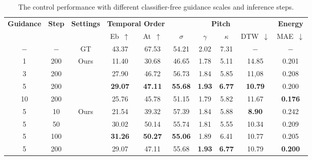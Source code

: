 \documentclass[letterpaper]{article} %
\begin{document}
\begin{table}[!t]
    \centering
    \caption{The control performance with different classifier-free guidance scales and inference steps.}
    \label{tab:classifier-Free guidance and inference steps}
        \begin{tabular}{cc|c|cc|cccc|c}
        \toprule
        \multirow{2}{*}{\textbf{Guidance}} & \multirow{2}{*}{\textbf{Step}} & \multirow{2}{*}{\textbf{Settings}} & \multicolumn{2}{c}{\textbf{Temporal Order}} & \multicolumn{4}{|c}{\textbf{Pitch}} & \multicolumn{1}{|c}{\textbf{Energy}} \\
        & &  & Eb~$\uparrow$ & At~$\uparrow$ & $\sigma$ & $\gamma$ & $\kappa$ & DTW~$\downarrow$ & MAE~$\downarrow$ \\
        \midrule
        \midrule
         $-$ & $-$ & GT & 43.37 & 67.53 & 54.21 & 2.02 & 7.31 & $-$ & $-$ \\
         \midrule
         1 & 200 & \multirow{4}{*}{Ours} & 11.40 & 30.68 & 46.65 & 1.78 & 5.11 & 14.85 & 0.201 \\
         3 & 200 & & 27.90 & 46.72 & 56.73 & 1.84 & 5.85 & 11,08 & 0.208 \\
         5 & 200 & &  \textbf{29.07} & \textbf{47.11} & \textbf{55.68} & \textbf{1.93} & \textbf{6.77} & \textbf{10.79} & 0.200 \\
         10 & 200 & &  25.76 & 45.78 & 51.15 & 1.79 & 5.82 & 11.67 & \textbf{0.176} \\
         \midrule
         5 & 10 & \multirow{4}{*}{Ours} &  21.54 & 39.32 & 57.39 & 1.84 & 5.88 & \textbf{8.90} & 0.242 \\
         5 & 50 & &  30.02 & 50.14 & 55.74 & 1.81 & 5.55 & 10.34 & 0.209 \\
         5 & 100 & & \textbf{31.26} & \textbf{50.27} & \textbf{55.06} & 1.89 & 6.41 & 10.77 & 0.205 \\
         5 & 200 & &  29.07 & 47.11 & 55.68 & \textbf{1.93} & \textbf{6.77} & 10.79 & \textbf{0.200} \\
        \bottomrule
        \end{tabular}
\end{table}
\end{document}
